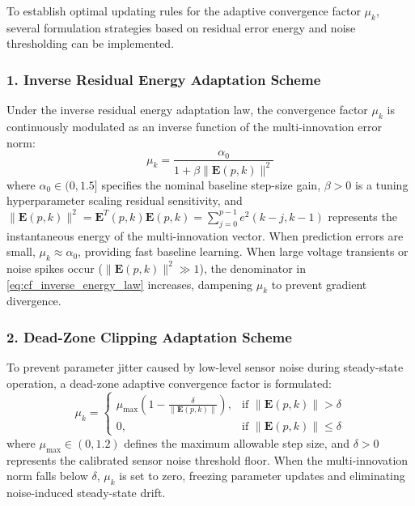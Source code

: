 To establish optimal updating rules for the adaptive convergence factor $\mu_k$, several formulation strategies based on residual error energy and noise thresholding can be implemented.

\subsubsection{1. Inverse Residual Energy Adaptation Scheme}
Under the inverse residual energy adaptation law, the convergence factor $\mu_k$ is continuously modulated as an inverse function of the multi-innovation error norm:
\begin{equation}
\mu_k = \frac{\alpha_0}{1 + \beta \|\mathbf{E}(p, k)\|^2}
\label{eq:cf_inverse_energy_law}
\end{equation}
where $\alpha_0 \in (0, 1.5]$ specifies the nominal baseline step-size gain, $\beta > 0$ is a tuning hyperparameter scaling residual sensitivity, and $\|\mathbf{E}(p, k)\|^2 = \mathbf{E}^T(p, k) \mathbf{E}(p, k) = \sum_{j=0}^{p-1} e^2(k-j, k-1)$ represents the instantaneous energy of the multi-innovation vector. When prediction errors are small, $\mu_k \approx \alpha_0$, providing fast baseline learning. When large voltage transients or noise spikes occur ($\|\mathbf{E}(p, k)\|^2 \gg 1$), the denominator in \eqref{eq:cf_inverse_energy_law} increases, dampening $\mu_k$ to prevent gradient divergence.

\subsubsection{2. Dead-Zone Clipping Adaptation Scheme}
To prevent parameter jitter caused by low-level sensor noise during steady-state operation, a dead-zone adaptive convergence factor is formulated:
\begin{equation}
\mu_k = \begin{cases}
\mu_{\max} \left( 1 - \frac{\delta}{\|\mathbf{E}(p, k)\|} \right), & \text{if } \|\mathbf{E}(p, k)\| > \delta \\
0, & \text{if } \|\mathbf{E}(p, k)\| \le \delta
\end{cases}
\label{eq:cf_deadzone_law_main}
\end{equation}
where $\mu_{\max} \in (0, 1.2)$ defines the maximum allowable step size, and $\delta > 0$ represents the calibrated sensor noise threshold floor. When the multi-innovation norm falls below $\delta$, $\mu_k$ is set to zero, freezing parameter updates and eliminating noise-induced steady-state drift.

